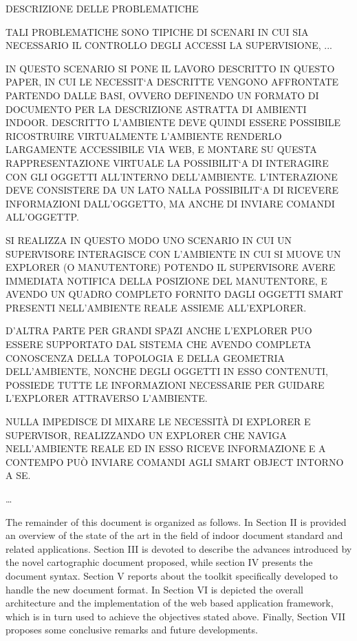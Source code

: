 DESCRIZIONE DELLE PROBLEMATICHE 

TALI PROBLEMATICHE SONO TIPICHE DI SCENARI IN CUI SIA NECESSARIO IL CONTROLLO DEGLI ACCESSI
LA SUPERVISIONE, ...






IN QUESTO SCENARIO SI PONE IL LAVORO DESCRITTO IN QUESTO PAPER, 
IN CUI LE NECESSIT`A DESCRITTE VENGONO AFFRONTATE PARTENDO DALLE BASI,
OVVERO DEFINENDO UN FORMATO DI DOCUMENTO PER LA DESCRIZIONE ASTRATTA DI AMBIENTI INDOOR.
DESCRITTO L'AMBIENTE DEVE QUINDI ESSERE POSSIBILE RICOSTRUIRE VIRTUALMENTE L'AMBIENTE
RENDERLO LARGAMENTE ACCESSIBILE VIA WEB, E MONTARE SU QUESTA RAPPRESENTAZIONE VIRTUALE 
LA POSSIBILIT`A DI INTERAGIRE CON GLI OGGETTI ALL'INTERNO DELL'AMBIENTE. L'INTERAZIONE DEVE CONSISTERE DA UN LATO NALLA POSSIBILIT`A DI RICEVERE INFORMAZIONI DALL'OGGETTO, MA ANCHE DI INVIARE COMANDI ALL'OGGETTP.

SI REALIZZA IN QUESTO MODO UNO SCENARIO IN CUI UN SUPERVISORE INTERAGISCE CON L'AMBIENTE IN CUI SI MUOVE UN EXPLORER (O MANUTENTORE) POTENDO IL SUPERVISORE AVERE IMMEDIATA NOTIFICA DELLA POSIZIONE DEL MANUTENTORE, E AVENDO UN QUADRO COMPLETO FORNITO DAGLI OGGETTI SMART PRESENTI NELL'AMBIENTE REALE ASSIEME ALL'EXPLORER.

D'ALTRA PARTE PER GRANDI SPAZI ANCHE L'EXPLORER PUO ESSERE SUPPORTATO DAL SISTEMA CHE AVENDO COMPLETA CONOSCENZA DELLA TOPOLOGIA E DELLA GEOMETRIA DELL'AMBIENTE, NONCHE DEGLI OGGETTI IN ESSO CONTENUTI, POSSIEDE TUTTE LE INFORMAZIONI NECESSARIE PER GUIDARE L'EXPLORER ATTRAVERSO L'AMBIENTE.

NULLA IMPEDISCE DI MIXARE LE NECESSITÀ DI EXPLORER E SUPERVISOR, REALIZZANDO UN EXPLORER CHE NAVIGA NELL'AMBIENTE REALE ED IN ESSO RICEVE INFORMAZIONE E A CONTEMPO PUÒ INVIARE COMANDI AGLI SMART OBJECT INTORNO A SE.

\ldots{}

The remainder of this document is organized as follows. In Section II is
provided an overview of the state of the art in the field of indoor document
standard and related applications. Section III is devoted to describe the
advances introduced by the novel cartographic document proposed, while section
IV presents the document syntax. Section V reports about the toolkit
specifically developed to handle the new document format. In Section VI is
depicted the overall architecture and the implementation of the web based
application framework, which is in turn used to achieve the objectives stated above.
Finally, Section VII proposes some conclusive remarks and future developments.
